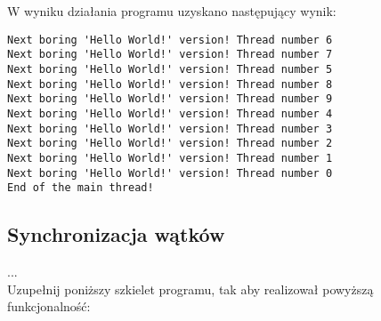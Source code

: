\documentclass[a4paper,15pt]{article}
\newcommand{\assignment}[2]{
    \begin{tcolorbox}[colback=black!5!white,colframe=black,title={Zadanie #1}]
        #2
    \end{tcolorbox}
}
\begin{document}
W wyniku działania programu uzyskano następujący wynik:
\begin{lstlisting}[style=CStyle, label=some-code, caption=Zadanie 2 - hello.c - wynik dzialania]
Next boring 'Hello World!' version! Thread number 6
Next boring 'Hello World!' version! Thread number 7
Next boring 'Hello World!' version! Thread number 5
Next boring 'Hello World!' version! Thread number 8
Next boring 'Hello World!' version! Thread number 9
Next boring 'Hello World!' version! Thread number 4
Next boring 'Hello World!' version! Thread number 3
Next boring 'Hello World!' version! Thread number 2
Next boring 'Hello World!' version! Thread number 1
Next boring 'Hello World!' version! Thread number 0
End of the main thread!
\end{lstlisting}

\newpage
\subsection{Synchronizacja wątków}
\assignment{3}{
... \\ 
Uzupełnij poniższy szkielet programu, tak aby realizował powyższą funkcjonalność:
}
\end{document}
